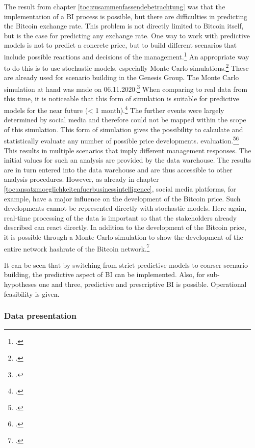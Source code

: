 The result from chapter \ref{toc:zusammenfassendebetrachtung} was that the implementation of a \ac{BI} process is possible, but there are
difficulties in predicting the Bitcoin exchange rate. This problem is not directly limited to Bitcoin
itself, but is the case for predicting any exchange rate. 
One way to work with predictive models is not to predict a concrete
price, but to build different scenarios that include possible reactions and decisions of the management.\footcite[Cf.][]{appendix:mcpreis}
An appropriate way to do this is to use stochastic models, especially Monte Carlo simulations.\footcite[Cf.][p. 28]{cocco2016modeling}
These are already used for scenario building in the Genesis Group. The Monte Carlo simulation at hand was
made on 06.11.2020.\footcite[Cf.][]{appendix:mcpreis} When comparing to real data from this time, it is noticeable that this form of simulation is suitable
for predictive models for the near future (< 1 month).\footcite[Cf.][]{appendix:btcusd} The further events were largely determined by social media
and therefore could not be mapped within the scope of this simulation.
This form of simulation gives the possibility
to calculate and statistically evaluate any number of possible price developments.
evaluation.\footcite[Cf.][]{appendix:mcpreis}\footcite[Cf.][]{appendix:mcszenarien} This results in multiple
scenarios that imply different management responses. The initial values for such an analysis
are provided by the data warehouse. The results
are in turn entered into the data warehouse and are thus accessible to other analysis procedures. However, as already
in chapter \ref{toc:ansatzmoeglichkeitenfuerbusinessintelligence}, social media platforms, for example, have a major influence on the
development of the Bitcoin price. Such developments cannot be represented directly with stochastic models.
Here again, real-time processing of the data is important so that the stakeholders already described can react directly.
In addition to the development of the Bitcoin price, it is possible through a Monte-Carlo simulation to show the development of the entire
network hashrate of the Bitcoin network.\footcite[Cf.][]{appendix:mchashrate}

It can be seen that by switching from strict predictive models to coarser scenario building,
the predictive aspect of \ac{BI} can be implemented. Also, for sub-hypotheses one and three, predictive and
prescriptive \ac{BI} is possible. Operational feasibility is given.

\subsubsection{Data presentation} \label{toc:datenpraesentation}

